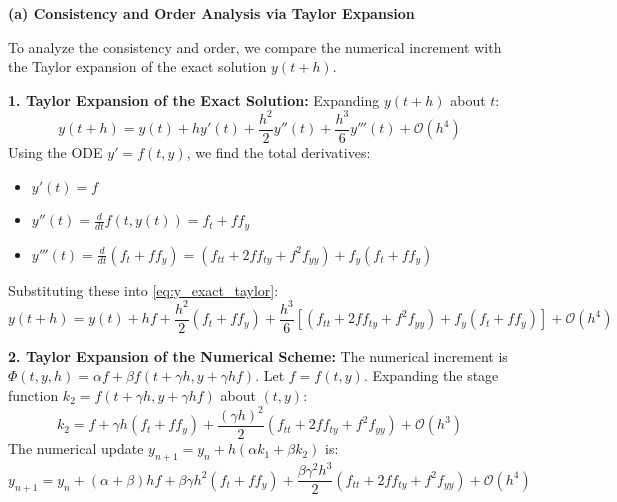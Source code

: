 \begin{solution}
\textbf{(a) Consistency and Order Analysis via Taylor Expansion}

To analyze the consistency and order, we compare the numerical increment with the Taylor expansion of the exact solution $y(t+h)$.

\textbf{1. Taylor Expansion of the Exact Solution:}
Expanding $y(t+h)$ about $t$:
\begin{equation}
    y(t+h) = y(t) + h y'(t) + \frac{h^2}{2} y''(t) + \frac{h^3}{6} y'''(t) + \mathcal{O}(h^4) \label{eq:y_exact_taylor}
\end{equation}
Using the ODE $y' = f(t, y)$, we find the total derivatives:
\begin{itemize}
    \item $y'(t) = f$
    \item $y''(t) = \frac{d}{dt} f(t, y(t)) = f_t + f f_y$
    \item $y'''(t) = \frac{d}{dt} (f_t + f f_y) = (f_{tt} + 2f f_{ty} + f^2 f_{yy}) + f_y(f_t + f f_y)$
\end{itemize}
Substituting these into \eqref{eq:y_exact_taylor}:
\[ y(t+h) = y(t) + h f + \frac{h^2}{2}(f_t + f f_y) + \frac{h^3}{6} [ (f_{tt} + 2f f_{ty} + f^2 f_{yy}) + f_y(f_t + f f_y) ] + \mathcal{O}(h^4) \]

\textbf{2. Taylor Expansion of the Numerical Scheme:}
The numerical increment is $\Phi(t, y, h) = \alpha f + \beta f(t + \gamma h, y + \gamma h f)$. Let $f = f(t, y)$.
Expanding the stage function $k_2 = f(t + \gamma h, y + \gamma h f)$ about $(t, y)$:
\[ k_2 = f + \gamma h (f_t + f f_y) + \frac{(\gamma h)^2}{2} (f_{tt} + 2f f_{ty} + f^2 f_{yy}) + \mathcal{O}(h^3) \]
The numerical update $y_{n+1} = y_n + h(\alpha k_1 + \beta k_2)$ is:
\begin{equation}
    y_{n+1} = y_n + (\alpha + \beta) h f + \beta \gamma h^2 (f_t + f f_y) + \frac{\beta \gamma^2 h^3}{2} (f_{tt} + 2f f_{ty} + f^2 f_{yy}) + \mathcal{O}(h^4) \label{eq:y_num_taylor}
\end{equation}


\end{solution}
